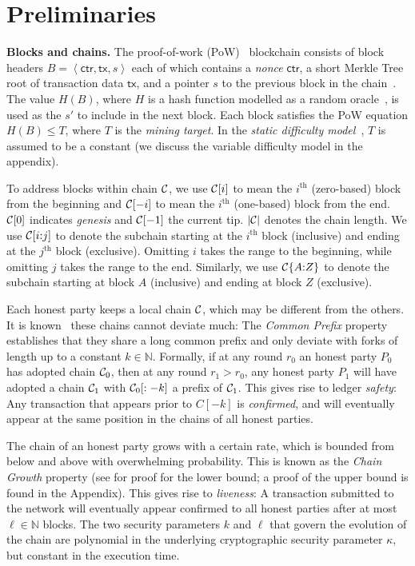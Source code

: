 \section{Preliminaries}

\noindent
\textbf{Blocks and chains.}
The proof-of-work (PoW)~\cite{pow}
blockchain consists of block headers $B = \left<\textsf{ctr}, \textsf{tx}, s\right>$ each of
which contains a \emph{nonce} $\textsf{ctr}$, a short Merkle Tree~\cite{merkle}
root of transaction
data $\textsf{tx}$, and a pointer $s$ to the previous block in the chain~\cite{backbone}. The value $H(B)$, where
$H$ is a hash function modelled as a random oracle~\cite{ro}, is used as the $s'$
to include in the next block. Each block satisfies the PoW equation
$H(B) \leq T$, where $T$ is the \emph{mining target}. In the \emph{static difficulty model}~\cite{backbone,backbone-new},
$T$ is assumed to be a constant (we discuss the variable difficulty model in the appendix).

To address blocks within chain $\mathcal{C}$, we use $\mathcal{C}[i]$ to mean the $i^\text{th}$ (zero-based)
block from the beginning and $\mathcal{C}[-i]$ to mean the $i^\text{th}$ (one-based) block from the end.
$\mathcal{C}[0]$ indicates \emph{genesis} and $\mathcal{C}[-1]$ the current tip.
$|\mathcal{C}|$ denotes the chain length. We use $\mathcal{C}[i{:}j]$
to denote the subchain starting at the $i^\text{th}$ block (inclusive) and ending at the $j^\text{th}$
block (exclusive).
Omitting $i$ takes the range to the beginning, while
omitting $j$ takes the range to the end.
Similarly, we use $\mathcal{C}\{A{:}Z\}$ to denote the subchain starting at block $A$
(inclusive) and ending at block $Z$ (exclusive).

Each honest party keeps a local
chain $\mathcal{C}$, which may be different from the others. It is known~\cite{backbone} these chains
cannot deviate much: The \emph{Common Prefix} property establishes
that they share a long common prefix and only deviate with forks of length up
to a constant $k \in \mathbb{N}$.
Formally, if at any round $r_0$ an honest party $P_0$ has adopted chain $\mathcal{C}_0$, then
at any round $r_1 > r_0$, any honest party $P_1$ will have adopted a chain $\mathcal{C}_1$
with $\mathcal{C}_0[:-k]$ a prefix of $\mathcal{C}_1$.
This gives rise to ledger \emph{safety}: Any transaction that appears
prior to $C[-k]$ is \emph{confirmed}, and will eventually appear at the same position
in the chains of all honest parties.

The chain of an honest party grows with a certain
rate, which is bounded from below and above with overwhelming probability. This is known as
the \emph{Chain Growth} property (see \cite{backbone} for proof for the
lower bound; a proof of the upper bound is found in the Appendix).
This gives rise to \emph{liveness}: A
transaction submitted to the network will eventually appear confirmed to all honest parties
after at most $\ell \in \mathbb{N}$ blocks. The two security parameters $k$ and $\ell$
that govern the evolution of the chain are polynomial in the underlying cryptographic security parameter
$\kappa$, but constant in the execution time.

